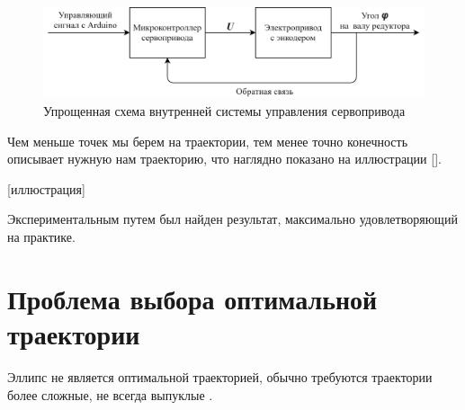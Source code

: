 \begin{figure}[h]
    \centering
    \includegraphics[width=\textwidth]{chapter_walking_model/figure1.png}
    \caption{Упрощенная схема внутренней системы управления сервопривода}
    \label{fig:upr_servo}
\end{figure}

Чем меньше точек мы берем на траектории, тем менее точно конечность описывает нужную нам траекторию, что наглядно показано на иллюстрации [].

[иллюстрация]

Экспериментальным путем был найден результат, максимально удовлетворяющий на практике.


\section{Проблема выбора оптимальной траектории}

Эллипс не является оптимальной траекторией, обычно требуются траектории более сложные, не всегда выпуклые \cite{Singla2018}. 